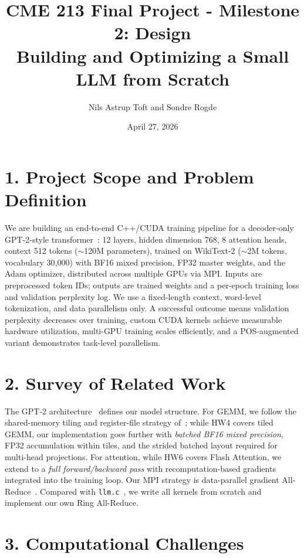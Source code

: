 \documentclass[11pt]{article}
\title{\vspace{-3em}CME 213 Final Project - Milestone 2: Design\\
\large Building and Optimizing a Small LLM from Scratch}
\author{Nils Astrup Toft \quad and \quad Sondre Rogde}
\date{April 27, 2026}
\begin{document}
\maketitle
\vspace{-2.5em}

\section*{1. Project Scope and Problem Definition}

We are building an end-to-end C++/CUDA training pipeline for a decoder-only GPT-2-style transformer~\cite{radford2019}: 12 layers, hidden dimension 768, 8 attention heads, context 512 tokens ($\sim$120M parameters), trained on WikiText-2 ($\sim$2M tokens, vocabulary 30{,}000) with BF16 mixed precision, FP32 master weights, and the Adam optimizer, distributed across multiple GPUs via MPI. Inputs are preprocessed token IDs; outputs are trained weights and a per-epoch training loss and validation perplexity log. We use a fixed-length context, word-level tokenization, and data parallelism only. A successful outcome means validation perplexity decreases over training, custom CUDA kernels achieve measurable hardware utilization, multi-GPU training scales efficiently, and a POS-augmented variant demonstrates task-level parallelism.

\section*{2. Survey of Related Work}

The GPT-2 architecture~\cite{radford2019} defines our model structure. For GEMM, we follow the shared-memory tiling and register-file strategy of~\cite{boehm2022}; while HW4 covers tiled GEMM, our implementation goes further with \emph{batched BF16 mixed precision}, FP32 accumulation within tiles, and the strided batched layout required for multi-head projections. For attention, while HW6 covers Flash Attention, we extend to a \emph{full forward/backward pass} with recomputation-based gradients~\cite{dao2022,dao2023} integrated into the training loop. Our MPI strategy is data-parallel gradient All-Reduce~\cite{li2020,sergeev2018}. Compared with \texttt{llm.c}~\cite{karpathy2024}, we write all kernels from scratch and implement our own Ring All-Reduce.

\section*{3. Computational Challenges}
\end{document}
